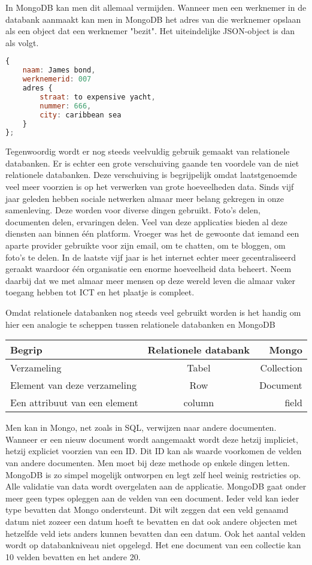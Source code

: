 \documentclass[a4paper,11pt]{article}
\newcommand{\head}[1]{\textnormal{\textbf{#1}}}
\begin{document}
In MongoDB kan men dit allemaal vermijden. Wanneer men een werknemer in de databank aanmaakt kan men in MongoDB het adres van die werknemer opslaan als een object dat een werknemer "bezit". Het uiteindelijke JSON-object is dan als volgt.

\begin{lstlisting}[language=javascript]
{
	naam: James bond,
	werknemerid: 007
	adres {
		straat: to expensive yacht,
		nummer: 666,
		city: caribbean sea
	}
};
\end{lstlisting}

Tegenwoordig wordt er nog steeds veelvuldig gebruik gemaakt van relationele databanken. Er is echter een grote verschuiving gaande ten voordele van de niet relationele databanken. Deze verschuiving is begrijpelijk omdat laatstgenoemde veel meer voorzien is op het verwerken van grote hoeveelheden data. Sinds vijf jaar geleden hebben sociale netwerken almaar meer belang gekregen in onze samenleving. Deze worden voor diverse dingen gebruikt. Foto's delen, documenten delen, ervaringen delen. Veel van deze applicaties bieden al deze diensten aan binnen één platform. Vroeger was het de gewoonte dat iemand een aparte provider gebruikte voor zijn email, om te chatten, om te bloggen, om foto's te delen. In de laatste vijf jaar is het internet echter meer gecentraliseerd geraakt waardoor één organisatie een enorme hoeveelheid data beheert. Neem daarbij dat we met almaar meer mensen op deze wereld leven die almaar vaker toegang hebben tot ICT en het plaatje is compleet.

Omdat relationele databanken nog steeds veel gebruikt worden is het handig om hier een analogie te scheppen tussen relationele databanken en MongoDB

\begin{tabular}{lcr}
\hline
\head{Begrip} & \head{Relationele databank} & \head{Mongo} \\
\hline
Verzameling & Tabel & Collection \\
Element van deze verzameling & Row & Document \\
Een attribuut van een element & column & field

\end{tabular}

Men kan in Mongo, net zoals in SQL, verwijzen naar andere documenten. Wanneer er een nieuw document wordt aangemaakt wordt deze hetzij impliciet, hetzij expliciet voorzien van een ID. Dit ID kan als waarde voorkomen de velden van andere documenten. Men moet bij deze methode op enkele dingen letten. MongoDB is zo simpel mogelijk ontworpen en legt zelf heel weinig restricties op. Alle validatie van data wordt overgelaten aan de applicatie. MongoDB gaat onder meer geen types opleggen aan de velden van een document. Ieder veld kan ieder type bevatten dat Mongo ondersteunt. Dit wilt zeggen dat een veld genaamd datum niet zozeer een datum hoeft te bevatten en dat ook andere objecten met hetzelfde veld iets anders kunnen bevatten dan een datum. Ook het aantal velden wordt op databankniveau niet opgelegd. Het ene document van een collectie kan 10 velden bevatten en het andere 20.
\end{document}
